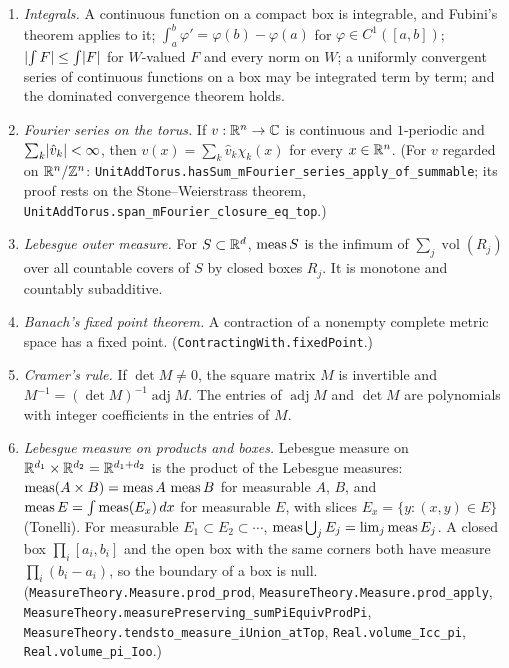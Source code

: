 {\begin{enumerate}[label=(E\arabic*),ref=(E\arabic*)]
  (\nolinkurl{second_derivative_symmetric_of_eventually}.)
\item\label{bp:p1:ext-integral} \emph{Integrals.} A continuous function on a compact box is integrable,
  and Fubini's theorem applies to it; $\int_a^b\varphi'=\varphi(b)-\varphi(a)$ for
  $\varphi\in C^1([a,b])$; $\lvert \int F\rvert\le\int\lvert F\rvert$ for $W$-valued $F$ and every norm on $W$; a
  uniformly convergent series of continuous functions on a box may be integrated term by term; and the
  dominated convergence theorem holds.
\item\label{bp:p1:ext-fourier} \emph{Fourier series on the torus.} If $v:\mathbb{R}^n\to\mathbb{C}$ is continuous and
  $1$-periodic and $\sum_k\lvert \hat v_k\rvert<\infty$, then $v(x)=\sum_k\hat v_k\chi_k(x)$ for every
  $x\in\mathbb{R}^n$. (For $v$ regarded on $\mathbb{R}^n/\mathbb{Z}^n$:
  \nolinkurl{UnitAddTorus.hasSum_mFourier_series_apply_of_summable}; its proof rests on the
  Stone--Weierstrass theorem, \nolinkurl{UnitAddTorus.span_mFourier_closure_eq_top}.)
\item\label{bp:p1:ext-lebesgue} \emph{Lebesgue outer measure.} For $S\subset\mathbb{R}^d$, $\operatorname{meas} S$ is the
  infimum of $\sum_j\operatorname{vol}(R_j)$ over all countable covers of $S$ by closed boxes $R_j$. It is
  monotone and countably subadditive.
\item\label{bp:p1:ext-banach} \emph{Banach's fixed point theorem.} A contraction of a nonempty complete
  metric space has a fixed point. (\nolinkurl{ContractingWith.fixedPoint}.)
\item\label{bp:p1:ext-cramer} \emph{Cramer's rule.} If $\det M\ne0$, the square matrix $M$ is invertible
  and $M^{-1}=(\det M)^{-1}\operatorname{adj}M$. The entries of $\operatorname{adj}M$ and $\det M$ are
  polynomials with integer coefficients in the entries of $M$.
\item\label{bp:p1:ext-measure} \emph{Lebesgue measure on products and boxes.} Lebesgue measure on
  $\mathbb{R}^{d_1}\times\mathbb{R}^{d_2}=\mathbb{R}^{d_1+d_2}$ is the product of the Lebesgue measures: $\operatorname{meas}(A\times
  B)=\operatorname{meas} A\,\operatorname{meas} B$ for measurable $A$, $B$, and $\operatorname{meas} E=\int\operatorname{meas}(E_x)\,dx$ for measurable $E$, with
  slices $E_x=\{y:(x,y)\in E\}$ (Tonelli). For measurable $E_1\subset E_2\subset\cdots$,
  $\operatorname{meas}\bigcup_jE_j=\lim_j\operatorname{meas} E_j$. A closed box $\prod_i[a_i,b_i]$ and the open box with the same
  corners both have measure $\prod_i(b_i-a_i)$, so the boundary of a box is null.
  (\nolinkurl{MeasureTheory.Measure.prod_prod}, \nolinkurl{MeasureTheory.Measure.prod_apply},
  \nolinkurl{MeasureTheory.measurePreserving_sumPiEquivProdPi},
  \nolinkurl{MeasureTheory.tendsto_measure_iUnion_atTop}, \nolinkurl{Real.volume_Icc_pi},
  \nolinkurl{Real.volume_pi_Ioo}.)
\end{enumerate}
\par}


